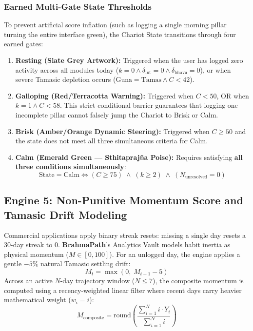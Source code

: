 \documentclass[11pt,a4paper]{article}
\newcommand{\AppName}{\textbf{BrahmaPath}}
\begin{document}
\subsubsection{Earned Multi-Gate State Thresholds}
To prevent artificial score inflation (such as logging a single morning pillar turning the entire interface green), the Chariot State transitions through four earned gates:
\begin{enumerate}[leftmargin=*]
    \item \textbf{Resting (Slate Grey Artwork):} Triggered when the user has logged zero activity across all modules today ($k = 0 \land \delta_{\text{int}} = 0 \land \delta_{\text{bhava}} = 0$), or when severe Tamasic depletion occurs ($\text{Guna} = \text{Tamas} \land C < 42$).
    \item \textbf{Galloping (Red/Terracotta Warning):} Triggered when $C < 50$, OR when $k = 1 \land C < 58$. This strict conditional barrier guarantees that logging one incomplete pillar cannot falsely jump the Chariot to Brisk or Calm.
    \item \textbf{Brisk (Amber/Orange Dynamic Steering):} Triggered when $C \ge 50$ and the state does not meet all three simultaneous criteria for Calm.
    \item \textbf{Calm (Emerald Green --- Sthitapraj\~na Poise):} Requires satisfying \textbf{all three conditions simultaneously}:
    \begin{equation}
        \text{State} = \text{Calm} \iff (C \ge 75) \;\land\; (k \ge 2) \;\land\; (N_{\text{unresolved}} = 0)
    \end{equation}
\end{enumerate}

\subsection{Engine 5: Non-Punitive Momentum Score and Tamasic Drift Modeling}
Commercial applications apply binary streak resets: missing a single day resets a 30-day streak to 0. \AppName's Analytics Vault models habit inertia as physical momentum ($M \in [0, 100]$). For an unlogged day, the engine applies a gentle $-5\%$ natural Tamasic settling drift:
\begin{equation}
    M_t = \max(0,\; M_{t-1} - 5)
\end{equation}
Across an active $N$-day trajectory window ($N \le 7$), the composite momentum is computed using a recency-weighted linear filter where recent days carry heavier mathematical weight ($w_i = i$):
\begin{equation}
    M_{\text{composite}} = \text{round}\left(\frac{\sum_{i=1}^N i \cdot Y_i}{\sum_{i=1}^N i}\right)
\end{equation}
\end{document}

